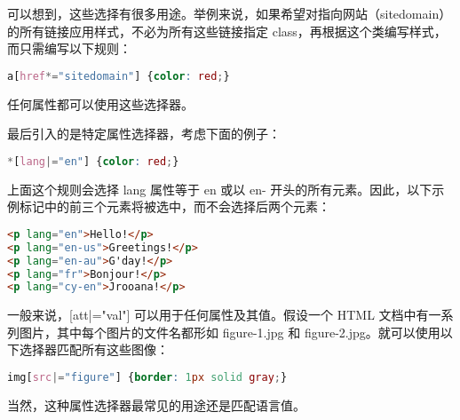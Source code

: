 可以想到，这些选择有很多用途。举例来说，如果希望对指向网站（sitedomain）的所有链接应用样式，不必为所有这些链接指定 class，再根据这个类编写样式，而只需编写以下规则：

\begin{lstlisting}[language=CSS]
a[href*="sitedomain"] {color: red;}
\end{lstlisting}


任何属性都可以使用这些选择器。


最后引入的是特定属性选择器，考虑下面的例子：

\begin{lstlisting}[language=CSS]
*[lang|="en"] {color: red;}
\end{lstlisting}

上面这个规则会选择 lang 属性等于 en 或以 en- 开头的所有元素。因此，以下示例标记中的前三个元素将被选中，而不会选择后两个元素：

\begin{lstlisting}[language=HTML]
<p lang="en">Hello!</p>
<p lang="en-us">Greetings!</p>
<p lang="en-au">G'day!</p>
<p lang="fr">Bonjour!</p>
<p lang="cy-en">Jrooana!</p>
\end{lstlisting}

一般来说，[att|="val"] 可以用于任何属性及其值。假设一个 HTML 文档中有一系列图片，其中每个图片的文件名都形如 figure-1.jpg 和 figure-2.jpg。就可以使用以下选择器匹配所有这些图像：

\begin{lstlisting}[language=CSS]
img[src|="figure"] {border: 1px solid gray;}
\end{lstlisting}

当然，这种属性选择器最常见的用途还是匹配语言值。


